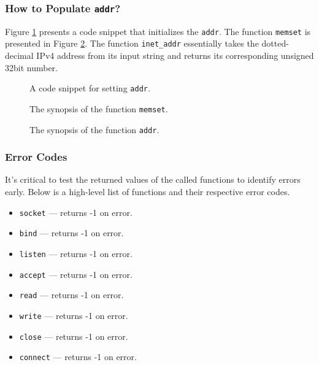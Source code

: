 \documentclass[pdftex,12pt,a4paper]{article}
\begin{document}
            \subsubsection{How to Populate \texttt{addr}?}
                 Figure \ref{fig:tcpaddr} presents a code snippet that
                 initializes the \texttt{addr}. The function \texttt{memset} is
                 presented in Figure \ref{fig:memset}. The function
                 \texttt{inet\_addr} essentially takes the dotted-decimal IPv4
                 address from its input string and returns its corresponding
                 unsigned 32bit number.
                 \begin{figure}[tbh]
                     \centering
                     
                     \caption{A code snippet for setting \texttt{addr}.}
                     \label{fig:tcpaddr}
                 \end{figure}
                 \begin{figure}[tbh]
                     \centering
                     
                     \caption{The synopsis of the function \texttt{memset}.}
                     \label{fig:memset}
                 \end{figure}
                 \begin{figure}[tbh]
                     \centering
                     
                     \caption{The synopsis of the function \texttt{addr}.}
                     \label{fig:inetaddr}
                 \end{figure}
                

            \subsubsection{Error Codes}
                It's critical to test the returned values of the called
                functions to identify errors early. Below is a high-level list
                of functions and their respective error codes.
                \begin{itemize}
                    \item \texttt{socket} --- returns -1 on error.
                    \item \texttt{bind} --- returns -1 on error.
                    \item \texttt{listen} --- returns -1 on error.
                    \item \texttt{accept} --- returns -1 on error.
                    \item \texttt{read} --- returns -1 on error.
                    \item \texttt{write} --- returns -1 on error.
                    \item \texttt{close} --- returns -1 on error.
                    \item \texttt{connect} --- returns -1 on error.
                \end{itemize}
            
\end{document}
